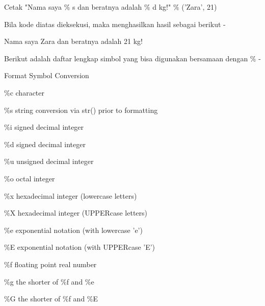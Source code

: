 \vspace{12pt}
Cetak "Nama saya $  \%  $ s dan beratnya adalah $  \%  $ d kg!"  $  \%  $ ('Zara', 21) \par
Bila kode diatas dieksekusi, maka menghasilkan hasil sebagai berikut - \par
Nama saya Zara dan beratnya adalah 21 kg! \par
Berikut adalah daftar lengkap simbol yang bisa digunakan bersamaan dengan $  \%  $ - \par
\vspace{12pt}
Format Symbol \hspace*{0.5in} Conversion \par
 $  \%  $c \hspace*{0.5in} character \par
 $  \%  $s \hspace*{0.5in} string conversion via str() prior to formatting \par
 $  \%  $i \hspace*{0.5in} signed decimal integer \par
 $  \%  $d \hspace*{0.5in} signed decimal integer \par
 $  \%  $u \hspace*{0.5in} unsigned decimal integer \par
 $  \%  $o \hspace*{0.5in} octal integer \par
 $  \%  $x \hspace*{0.5in} hexadecimal integer (lowercase letters) \par
 $  \%  $X \hspace*{0.5in} hexadecimal integer (UPPERcase letters) \par
 $  \%  $e \hspace*{0.5in} exponential notation (with lowercase 'e') \par
 $  \%  $E \hspace*{0.5in} exponential notation (with UPPERcase 'E') \par
 $  \%  $f \hspace*{0.5in} floating point real number \par
 $  \%  $g \hspace*{0.5in} the shorter of  $  \%  $f and  $  \%  $e \par
 $  \%  $G \hspace*{0.5in} the shorter of  $  \%  $f and  $  \%  $E \par
\vspace{12pt}
